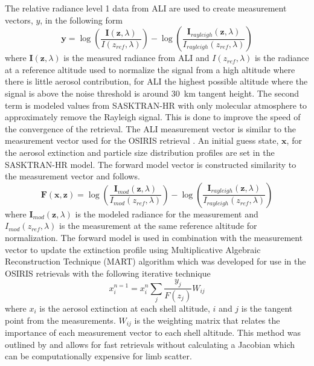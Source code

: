\documentclass[12pt]{article}
\begin{document}
The relative radiance level 1 data from ALI are used to create measurement vectors, $y$, in the following form
\begin{equation}
    \mathbf{y} = \log\left(\frac{\mathbf{I}(\mathbf{z},\lambda)}{I(z_{ref},\lambda)}\right)-\log\left(\frac{\mathbf{I}_{rayleigh}(\mathbf{z},\lambda)}{I_{rayleigh}(z_{ref},\lambda)}\right)
    \label{eqn:measurementVector}
\end{equation}
where $\mathbf{I}(\mathbf{z},\lambda)$ is the measured radiance from ALI and $I(z_{ref},\lambda)$ is the radiance at a reference altitude used to normalize the signal from a high altitude where there is little aerosol contribution, for ALI the highest possible altitude where the signal is above the noise threshold is around 30~km tangent height. The second term is modeled values from SASKTRAN-HR with only molecular atmosphere to approximately remove the Rayleigh signal. This is done to improve the speed of the convergence of the retrieval. The ALI measurement vector is similar to the measurement vector used for the OSIRIS retrieval \citep{Bourassa2007,Bourassa2011}. An initial guess state, $\mathbf{x}$, for the aerosol extinction and particle size distribution profiles are set in the SASKTRAN-HR model. The forward model vector is constructed similarity to the measurement vector and follows.
\begin{equation}
    \mathbf{F}(\mathbf{x},\mathbf{z}) = \log\left(\frac{\mathbf{I}_{mod}(\mathbf{z},\lambda)}{I_{mod}(z_{ref},\lambda)}\right)-\log\left(\frac{\mathbf{I}_{rayleigh}(\mathbf{z},\lambda)}{I_{rayleigh}(z_{ref},\lambda)}\right)
    \label{eqn:forwardModel}
\end{equation}
where $\mathbf{I}_{mod}(\mathbf{z},\lambda)$ is the modeled radiance for the measurement and $I_{mod}(z_{ref},\lambda)$ is the measurement at the same reference altitude for normalization. The forward model is used in combination with the measurement vector to update the extinction profile using Multiplicative Algebraic Reconstruction Technique (MART) algorithm which was developed for use in the OSIRIS retrievals \citep{Bourassa2012a} with the following iterative technique
\begin{equation}
    x_{i}^{n=1} = x_{i}^{n}\sum_{j}\frac{y_{j}}{F(z_{j})}W_{ij}
\end{equation}
where $x_{i}$ is the aerosol extinction at each shell altitude, $i$ and $j$ is the tangent point from the measurements. $W_{ij}$ is the weighting matrix that relates the importance of each measurement vector to each shell altitude. This method was outlined by \cite{Degenstein2009} and allows for fast retrievals without calculating a Jacobian which can be computationally expensive for limb scatter.
\end{document}
